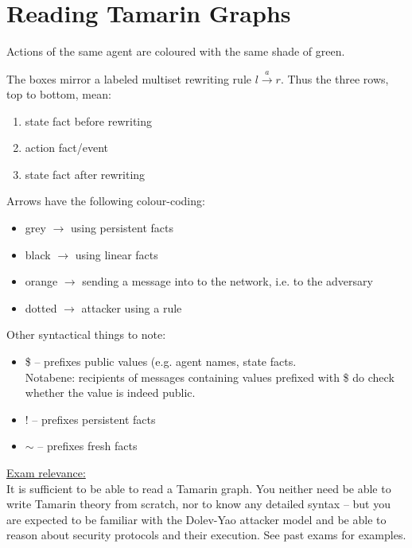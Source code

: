 \section{Reading Tamarin Graphs}

Actions of the same agent are coloured with the same shade of green.

The boxes mirror a labeled multiset rewriting rule $l \xrightarrow{a} r$. Thus the three rows, top to bottom, mean:

\begin{enumerate}
    \item state fact before rewriting
    \item action fact/event
    \item state fact after rewriting
\end{enumerate}

Arrows have the following colour-coding:

\begin{itemize}
    \item grey   $\longrightarrow$ using persistent facts
    \item black  $\longrightarrow$ using linear facts
    \item orange $\longrightarrow$ sending a message into to the network, i.e. to the adversary
    \item dotted $\longrightarrow$ attacker using a rule
\end{itemize}

Other syntactical things to note:

\begin{itemize}
    \item \$ -- prefixes public values (e.g. agent names, state facts. \\
                Notabene: recipients of messages containing values prefixed with \$ do check whether the value is indeed public.
    \item ! -- prefixes persistent facts
    \item $\sim$ -- prefixes fresh facts
\end{itemize}

\underline{Exam relevance:}\\
It is sufficient to be able to read a Tamarin graph. You neither need be able to write Tamarin theory from scratch, nor to know any detailed syntax -- but you are expected to be familiar with the Dolev-Yao attacker model and be able to reason about security protocols and their execution. See past exams for examples.


%
%